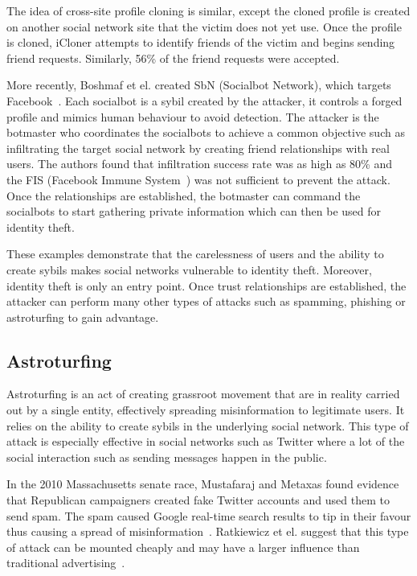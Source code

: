 The idea of cross-site profile cloning is similar, except the cloned profile is
created on another social network site that the victim does not yet use. Once
the profile is cloned, iCloner attempts to identify friends of the
victim and begins sending friend requests. Similarly, 56\% of the friend
requests were accepted. 

More recently, Boshmaf et el. created SbN (Socialbot Network), which targets
Facebook~\cite{boshmaf2011socialbot}. Each socialbot is a sybil created by the
attacker, it controls a forged profile and mimics human behaviour to avoid
detection. The attacker is the botmaster who coordinates the socialbots to
achieve a common objective such as infiltrating the target social network by creating
friend relationships with real users. The authors found that infiltration
success rate was as high as 80\% and the FIS (Facebook Immune
System~\cite{stein2011facebook}) was not sufficient to prevent the attack. Once
the relationships are established, the botmaster can command the socialbots to
start gathering private information which can then be used for identity theft.


These examples demonstrate that the carelessness of users and the ability to
create sybils makes social networks vulnerable to identity theft. Moreover,
identity theft is only an entry point. Once trust relationships are established,
the attacker can perform many other types of attacks such as spamming, phishing
or astroturfing to gain advantage.

\subsection{Astroturfing}
Astroturfing is an act of creating grassroot movement that are in reality
carried out by a single entity, effectively spreading misinformation to
legitimate users. It relies on the ability to create sybils in the underlying
social network. This type of attack is especially effective in social networks
such as Twitter where a lot of the social interaction such as sending messages
happen in the public.

In the 2010 Massachusetts senate race, Mustafaraj and Metaxas found evidence
that Republican campaigners created fake Twitter accounts and used them to send
spam. The spam caused Google real-time search results to tip in their favour
thus causing a spread of misinformation~\cite{mustafaraj2010obscurity}.
Ratkiewicz et el. suggest that this type of attack can be mounted cheaply and
may have a larger influence than traditional
advertising~\cite{ratkiewicz2011truthy}.

